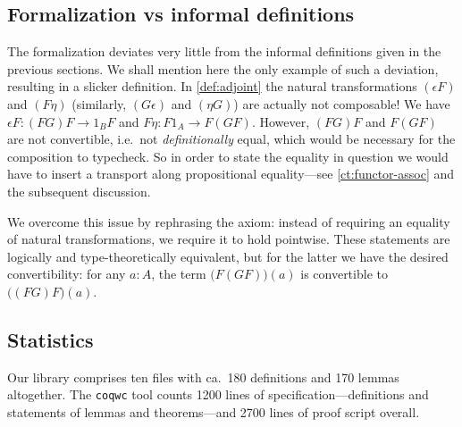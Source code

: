 \subsection*{Formalization vs informal definitions}

The formalization deviates very little from the informal definitions given in the previous sections.
We shall mention here the only example of such a deviation, resulting in a slicker definition. 
In \autoref{def:adjoint} the natural transformations $(\epsilon F)$ and $(F\eta)$ (similarly, 
$(G\epsilon)$ and $(\eta G)$) are actually not
composable! We have $\epsilon F : (FG)F \to 1_{B}F$ and $F\eta : F1_A \to F(GF)$. 
However, $(FG)F$ and $F(GF)$ are not convertible, i.e.\ not \emph{definitionally} equal, 
which would be necessary for the composition to typecheck. So in order to state the equality in question
we would have to insert a transport along propositional equality---see \autoref{ct:functor-assoc} and the subsequent discussion.

We overcome this issue by rephrasing the axiom: instead of requiring an equality of natural 
transformations, we require it to hold pointwise. 
These statements are logically and type-theoretically equivalent, but for the latter we have the
desired convertibility: for any $a : A$, the term $\big(F(GF)\big)(a)$ is convertible to $\big((FG)F\big)(a)$.



\subsection*{Statistics}

Our library comprises ten files with ca.\ 180 definitions and 170 lemmas altogether.
The \texttt{coqwc} tool counts 1200 lines of specification---definitions and statements of lemmas and theorems---and 
2700 lines of proof script overall.




